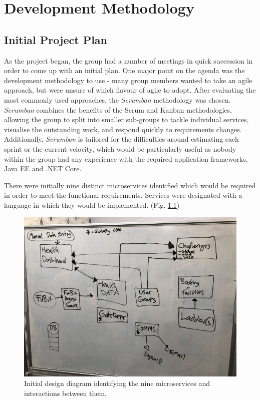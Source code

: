 \chapter{Development Methodology}

\section{Initial Project Plan}
As the project began, the group had a number of meetings in quick succession in order to come up with an initial plan. One major point on the agenda was the development methodology to use - many group members wanted to take an agile approach, but were unsure of which flavour of agile to adopt. After evaluating the most commonly used approaches, the \textit{Scrumban}\cite{scrumban} methodology was chosen. \textit{Scrumban} combines the benefits of the Scrum and Kanban methodologies, allowing the group to split into smaller sub-groups to tackle individual services, visualise the outstanding work, and respond quickly to requirements changes. Additionally, \textit{Scrumban} is tailored for the difficulties around estimating each sprint or the current velocity, which would be particularly useful as nobody within the group had any experience with the required application frameworks, Java EE and .NET Core. 

There were initially nine distinct microservices identified which would be required in order to meet the functional requirements. Services were designated with a language in which they would be implemented. (Fig. \ref{fig:initial_spec_chart})

\begin{figure}[H]
    \centering
    \includegraphics[width=\textwidth]{Images/Initial_Spec_Chart.jpg}
    \caption{Initial design diagram identifying the nine microservices and interactions between them.}
    \label{fig:initial_spec_chart}
\end{figure}

